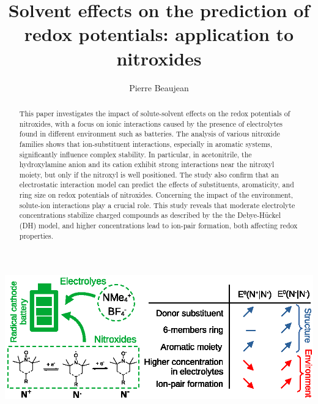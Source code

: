 \documentclass[review,preprint]{elsarticle}
\begin{document}
	
	\begin{frontmatter}
		
		
		\title{Solvent effects on the prediction of redox potentials: application to nitroxides}
		
		\author[1]{Pierre Beaujean}
		
		
		
		
		\begin{abstract}
			This paper investigates the impact of solute-solvent effects on the redox potentials of nitroxides, with a focus on ionic interactions caused by the presence of electrolytes found in different environment such as batteries. The analysis of various nitroxide families shows that ion-substituent interactions, especially in aromatic systems, significantly influence complex stability. In particular, in acetonitrile, the hydroxylamine anion and its cation exhibit strong interactions near the nitroxyl moiety, but only if the nitroxyl is well positioned. The study also confirm that an electrostatic interaction model can predict the effects of substituents, aromaticity, and ring size on redox potentials of nitroxides. Concerning the impact of the environment, solute-ion interactions play a crucial role. This study reveals that moderate electrolyte concentrations stabilize charged compounds as described by the the Debye-Hückel (DH) model, and higher concentrations lead to ion-pair formation, both affecting redox properties. 
		\end{abstract}
		
		
		\begin{graphicalabstract}
			\includegraphics{Graphical_Abstract}
		\end{graphicalabstract}
		

\end{frontmatter}
\end{document}
